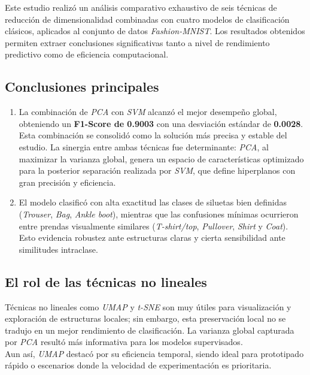 \documentclass[conference]{IEEEtran}
\begin{document}
Este estudio realizó un análisis comparativo exhaustivo de seis técnicas de reducción de dimensionalidad combinadas con cuatro modelos de clasificación clásicos, aplicados al conjunto de datos \textit{Fashion-MNIST}. Los resultados obtenidos permiten extraer conclusiones significativas tanto a nivel de rendimiento predictivo como de eficiencia computacional.\\

\subsection{Conclusiones principales}

\begin{enumerate}
    \item[(1)] La combinación de \textit{PCA} con \textit{SVM} alcanzó el mejor desempeño global, obteniendo un \textbf{F1-Score de 0.9003} con una desviación estándar de \textbf{0.0028}. Esta combinación se consolidó como la solución más precisa y estable del estudio. La sinergia entre ambas técnicas fue determinante: \textit{PCA}, al maximizar la varianza global, genera un espacio de características optimizado para la posterior separación realizada por \textit{SVM}, que define hiperplanos con gran precisión y eficiencia.\\[2pt]

    \item[(2)] El modelo clasificó con alta exactitud las clases de siluetas bien definidas (\textit{Trouser}, \textit{Bag}, \textit{Ankle boot}), mientras que las confusiones mínimas ocurrieron entre prendas visualmente similares (\textit{T-shirt/top}, \textit{Pullover}, \textit{Shirt} y \textit{Coat}). Esto evidencia robustez ante estructuras claras y cierta sensibilidad ante similitudes intraclase.
\end{enumerate}

\subsection{El rol de las técnicas no lineales}

Técnicas no lineales como \textit{UMAP} y \textit{t-SNE} son muy útiles para visualización y exploración de estructuras locales; sin embargo, esta preservación local no se tradujo en un mejor rendimiento de clasificación. La varianza global capturada por \textit{PCA} resultó más informativa para los modelos supervisados.\\

Aun así, \textit{UMAP} destacó por su eficiencia temporal, siendo ideal para prototipado rápido o escenarios donde la velocidad de experimentación es prioritaria.\\
\end{document}
